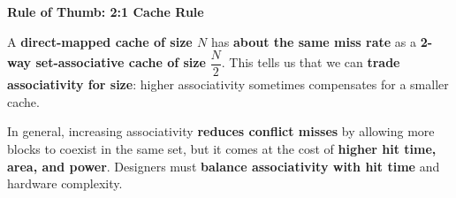 \highspace
\begin{flushleft}
    \textcolor{Green3}{ \textbf{Rule of Thumb: 2:1 Cache Rule}}
\end{flushleft}
A \textbf{direct-mapped cache of size $N$} has \textbf{about the same miss rate} as a \textbf{2-way set-associative cache of size} $\dfrac{N}{2}$. This tells us that we can \textbf{trade associativity for size}: higher associativity sometimes compensates for a smaller cache.

\highspace
In general, increasing associativity \textbf{reduces conflict misses} by allowing more blocks to coexist in the same set, but it comes at the cost of \textbf{higher hit time, area, and power}. Designers must \textbf{balance associativity with hit time} and hardware complexity.